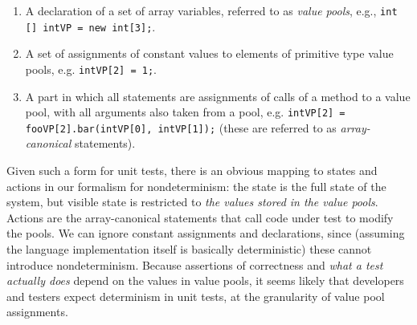 \begin{enumerate}
\item A declaration of a set of array variables, referred to as
  \emph{value pools}, e.g., {\tt int [] intVP = new int[3];}.
  \item A set of assignments of constant values to elements of
    primitive type value pools, e.g. {\tt intVP[2] = 1;}.
    \item A part in which all statements are assignments of calls of a
      method to a value pool, with all arguments also
      taken from a pool, e.g. {\tt intVP[2] = fooVP[2].bar(intVP[0],
        intVP[1]);} (these are referred to as \emph{array-canonical} statements).
    \end{enumerate}

Given such a form for unit tests, there is an obvious mapping to
states and actions in our formalism for nondeterminism:  the state is
the full state of the system, but visible state is restricted to
\emph{the values stored in the value pools}.  Actions are the
array-canonical statements that call code under test to modify the pools.  We can ignore constant assignments and
declarations, since (assuming the language implementation itself is
basically deterministic) these cannot introduce nondeterminism.
Because assertions of correctness and \emph{what a test actually does}
depend on the values in value pools, it seems likely that developers
and testers expect determinism in unit tests, at the granularity of
value pool assignments.


